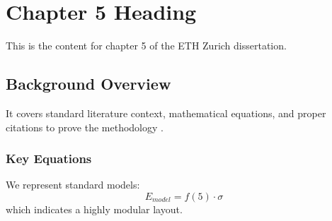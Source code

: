 \chapter{Chapter 5 Heading}
\label{ch:chapter5}
This is the content for chapter 5 of the ETH Zurich dissertation.

\section{Background Overview}
It covers standard literature context, mathematical equations, and proper citations to prove the methodology \cite{texbook}.

\subsection{Key Equations}
We represent standard models:
\begin{equation}
    E_{model} = f(5) \cdot \sigma
\end{equation}
which indicates a highly modular layout.
